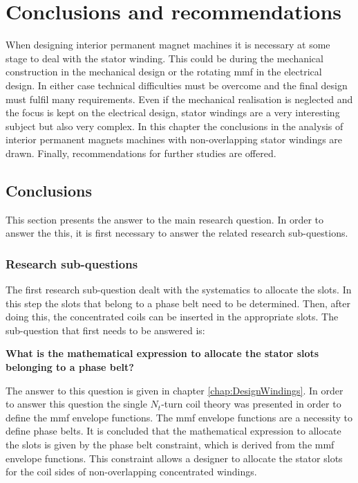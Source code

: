 \chapter{Conclusions and recommendations}\label{chap:ConlusionsRecommendations}
When designing interior permanent magnet machines it is necessary at some stage to deal with the stator winding. This could be during the mechanical construction in the mechanical design or the rotating mmf in the electrical design. In either case  technical difficulties must be overcome and the final design must fulfil many requirements. Even if the mechanical realisation is neglected and the focus is kept on the electrical design, stator windings are a very interesting subject but also very complex. In this chapter the conclusions in the analysis of interior permanent magnets machines with non-overlapping stator windings are drawn. Finally, recommendations for further studies are offered.

\section{Conclusions}
This section presents the answer to the main research question. In order to answer the this, it is first necessary to answer the related research sub-questions.
 
\subsection{Research sub-questions}
The first research sub-question dealt with the systematics to allocate the slots. In this step the slots that belong to a phase belt need to be determined. Then, after doing this, the concentrated coils can be inserted in the appropriate slots. The sub-question that first needs to be answered is: \newline 
\begin{minipage}{\textwidth}
\vspace{12pt} 
\textbf{What is the mathematical expression to allocate the stator slots belonging to a phase belt?} 
\vspace{12pt}
\end{minipage}
The answer to this question is given in chapter \ref{chap:DesignWindings}. In order to answer this question the single $N_t$-turn coil theory was presented in order to define the mmf envelope functions. The mmf envelope functions are a necessity to define phase belts. It is concluded that the mathematical expression to allocate the slots is given by the phase belt constraint, which is derived from the mmf envelope functions. This constraint allows a designer to allocate the stator slots for the coil sides of non-overlapping concentrated windings.   

